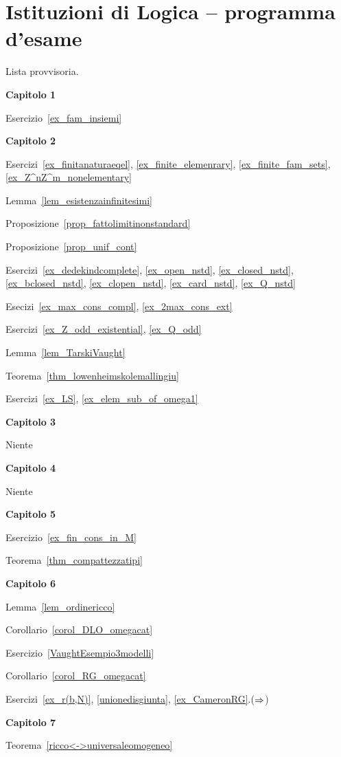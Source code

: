 \chapter*{Istituzioni di Logica -- programma d'esame }

Lista provvisoria.

\textbf{Capitolo 1}

Esercizio~\ref{ex_fam_insiemi} 

\textbf{Capitolo 2}

Esercizi~\ref{ex_finitanaturaeqel}, \ref{ex_finite_elemenrary}, \ref{ex_finite_fam_sets}, \ref{ex_Z^nZ^m_nonelementary}

Lemma~\ref{lem_esistenzainfinitesimi}

Proposizione~\ref{prop_fattolimitinonstandard}

Proposizione~\ref{prop_unif_cont}

Esercizi~\ref{ex_dedekindcomplete}, \ref{ex_open_nstd}, \ref{ex_closed_nstd}, \ref{ex_bclosed_nstd}, \ref{ex_clopen_nstd}, \ref{ex_card_nstd}, \ref{ex_Q_nstd}

Esecizi~\ref{ex_max_cons_compl}, \ref{ex_2max_cons_ext}

Esercizi~\ref{ex_Z_odd_existential}, \ref{ex_Q_odd}

Lemma~\ref{lem_TarskiVaught}

Teorema~\ref{thm_lowenheimskolemallingiu}

Esercizi~\ref{ex_LS}, \ref{ex_elem_sub_of_omega1}

\textbf{Capitolo 3}

Niente


\textbf{Capitolo 4}

Niente

\textbf{Capitolo 5}

Esercizio~\ref{ex_fin_cons_in_M}

Teorema~\ref{thm_compattezzatipi}

\textbf{Capitolo 6}

Lemma~\ref{lem_ordinericco}

Corollario~\ref{corol_DLO_omegacat}

Esercizio~\ref{VaughtEsempio3modelli}

Corollario~\ref{corol_RG_omegacat}

Esercizi~\ref{ex_r(b,N)}, \ref{unionedisgiunta}, \ref{ex_CameronRG}.($\Rightarrow$) 

\textbf{Capitolo 7}

Teorema~\ref{ricco<->universaleomogeneo}
